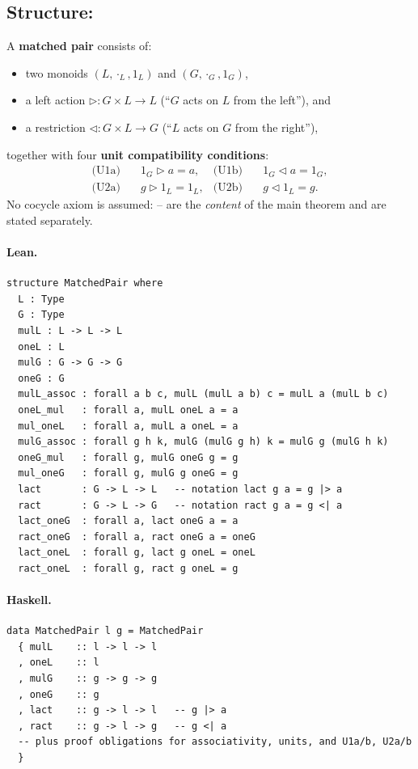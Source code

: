 \documentclass[11pt,a4paper]{article}
\begin{document}
\subsection{Structure: }

\begin{defn}
A \textbf{matched pair} consists of:
\begin{itemize}
  \item two monoids $(L, \cdot_L, 1_L)$ and $(G, \cdot_G, 1_G)$,
  \item a left action $\triangleright : G \times L \to L$
        (``$G$ acts on $L$ from the left''), and
  \item a restriction $\triangleleft : G \times L \to G$
        (``$L$ acts on $G$ from the right''),
\end{itemize}
together with four \textbf{unit compatibility conditions}:
\begin{align*}
  \text{(U1a)}\quad & 1_G \triangleright a = a, &
  \text{(U1b)}\quad & 1_G \triangleleft a = 1_G, \\
  \text{(U2a)}\quad & g \triangleright 1_L = 1_L, &
  \text{(U2b)}\quad & g \triangleleft 1_L = g.
\end{align*}
No cocycle axiom is assumed: -- are the \emph{content} of the
main theorem and are stated separately.
\end{defn}

\paragraph{Lean.}
\begin{lstlisting}[style=lean]
structure MatchedPair where
  L : Type
  G : Type
  mulL : L -> L -> L
  oneL : L
  mulG : G -> G -> G
  oneG : G
  mulL_assoc : forall a b c, mulL (mulL a b) c = mulL a (mulL b c)
  oneL_mul   : forall a, mulL oneL a = a
  mul_oneL   : forall a, mulL a oneL = a
  mulG_assoc : forall g h k, mulG (mulG g h) k = mulG g (mulG h k)
  oneG_mul   : forall g, mulG oneG g = g
  mul_oneG   : forall g, mulG g oneG = g
  lact       : G -> L -> L   -- notation lact g a = g |> a
  ract       : G -> L -> G   -- notation ract g a = g <| a
  lact_oneG  : forall a, lact oneG a = a
  ract_oneG  : forall a, ract oneG a = oneG
  lact_oneL  : forall g, lact g oneL = oneL
  ract_oneL  : forall g, ract g oneL = g
\end{lstlisting}

\paragraph{Haskell.}
\begin{lstlisting}[style=haskell]
data MatchedPair l g = MatchedPair
  { mulL    :: l -> l -> l
  , oneL    :: l
  , mulG    :: g -> g -> g
  , oneG    :: g
  , lact    :: g -> l -> l   -- g |> a
  , ract    :: g -> l -> g   -- g <| a
  -- plus proof obligations for associativity, units, and U1a/b, U2a/b
  }
\end{lstlisting}
\end{document}

